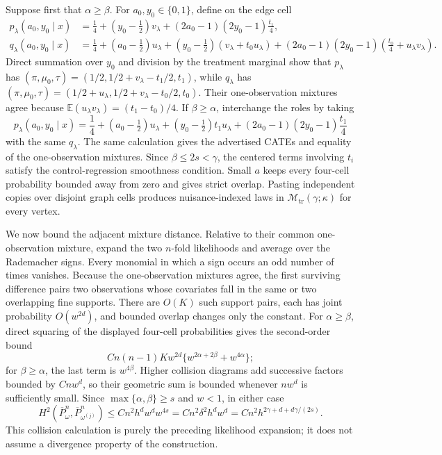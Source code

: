 Suppose first that \(\alpha\ge\beta\). For \(a_0,y_0\in\{0,1\}\), define on the edge cell
\[
\begin{aligned}
p_\lambda(a_0,y_0\mid x)
&=\frac14+(y_0-\tfrac12)v_\lambda+(2a_0-1)(2y_0-1)\frac{t_1}{4},\\
q_\lambda(a_0,y_0\mid x)
&=\frac14+(a_0-\tfrac12)u_\lambda+(y_0-\tfrac12)(v_\lambda+t_0u_\lambda)
 +(2a_0-1)(2y_0-1)\left(\frac{t_0}{4}+u_\lambda v_\lambda\right).
\end{aligned}
\]
Direct summation over \(y_0\) and division by the treatment marginal show that \(p_\lambda\) has \((\pi,\mu_0,\tau)=(1/2,1/2+v_\lambda-t_1/2,t_1)\), while \(q_\lambda\) has \((\pi,\mu_0,\tau)=(1/2+u_\lambda,1/2+v_\lambda-t_0/2,t_0)\). Their one-observation mixtures agree because \(\mathbb E(u_\lambda v_\lambda)=(t_1-t_0)/4\). If \(\beta\ge\alpha\), interchange the roles by taking
\[
p_\lambda(a_0,y_0\mid x)=\frac14+(a_0-\tfrac12)u_\lambda+(y_0-\tfrac12)t_1u_\lambda+(2a_0-1)(2y_0-1)\frac{t_1}{4}
\]
with the same \(q_\lambda\). The same calculation gives the advertised CATEs and equality of the one-observation mixtures. Since \(\beta\le2s<\gamma\), the centered terms involving \(t_i\) satisfy the control-regression smoothness condition. Small \(a\) keeps every four-cell probability bounded away from zero and gives strict overlap. Pasting independent copies over disjoint graph cells produces nuisance-indexed laws in \(\mathcal M_{\mathrm{tr}}(\gamma;\kappa)\) for every vertex.

We now bound the adjacent mixture distance. Relative to their common one-observation mixture, expand the two \(n\)-fold likelihoods and average over the Rademacher signs. Every monomial in which a sign occurs an odd number of times vanishes. Because the one-observation mixtures agree, the first surviving difference pairs two observations whose covariates fall in the same or two overlapping fine supports. There are \(O(K)\) such support pairs, each has joint probability \(O(w^{2d})\), and bounded overlap changes only the constant. For \(\alpha\ge\beta\), direct squaring of the displayed four-cell probabilities gives the second-order bound
\[
C n(n-1)K w^{2d}\{w^{2\alpha+2\beta}+w^{4\alpha}\};
\]
for \(\beta\ge\alpha\), the last term is \(w^{4\beta}\). Higher collision diagrams add successive factors bounded by \(Cn w^d\), so their geometric sum is bounded whenever \(nw^d\) is sufficiently small. Since \(\max\{\alpha,\beta\}\ge s\) and \(w<1\), in either case
\[
H^2(\overline P_\omega^n,\overline P_{\omega^{(j)}}^n)
\le Cn^2h^dw^dw^{4s}
=Cn^2\delta^2h^dw^d
=Cn^2h^{2\gamma+d+d\gamma/(2s)}.
\]
This collision calculation is purely the preceding likelihood expansion; it does not assume a divergence property of the construction.

